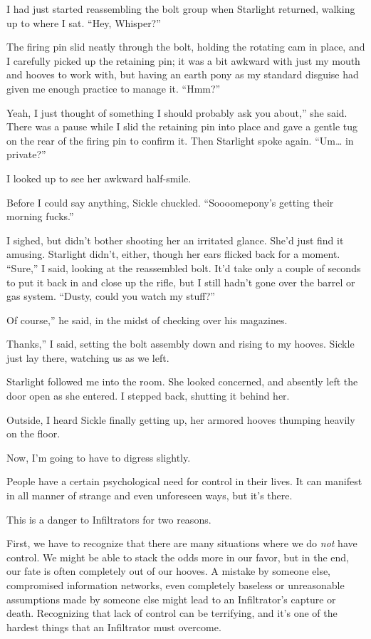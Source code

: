 I had just started reassembling the bolt group when Starlight returned, walking up to where I sat. “Hey, Whisper?”

The firing pin slid neatly through the bolt, holding the rotating cam in place, and I carefully picked up the retaining pin; it was a bit awkward with just my mouth and hooves to work with, but having an earth pony as my standard disguise had given me enough practice to manage it. “Hmm?”

\leavevmode{}Yeah, I just thought of something I should probably ask you about,” she said. There was a pause while I slid the retaining pin into place and gave a gentle tug on the rear of the firing pin to confirm it. Then Starlight spoke again. “Um… in private?”

I looked up to see her awkward half-smile.

Before I could say anything, Sickle chuckled. “Soooomepony’s getting their morning fucks.”

I sighed, but didn’t bother shooting her an irritated glance. She’d just find it amusing. Starlight didn’t, either, though her ears flicked back for a moment. “Sure,” I said, looking at the reassembled bolt. It’d take only a couple of seconds to put it back in and close up the rifle, but I still hadn’t gone over the barrel or gas system. “Dusty, could you watch my stuff?”

\leavevmode{}Of course,” he said, in the midst of checking over his magazines.

\leavevmode{}Thanks,” I said, setting the bolt assembly down and rising to my hooves. Sickle just lay there, watching us as we left.

Starlight followed me into the room. She looked concerned, and absently left the door open as she entered. I stepped back, shutting it behind her.

Outside, I heard Sickle finally getting up, her armored hooves thumping heavily on the floor.

Now, I’m going to have to digress slightly.

People have a certain psychological need for control in their lives. It can manifest in all manner of strange and even unforeseen ways, but it’s there.

This is a danger to Infiltrators for two reasons.

First, we have to recognize that there are many situations where we do \textit{not} have control. We might be able to stack the odds more in our favor, but in the end, our fate is often completely out of our hooves. A mistake by someone else, compromised information networks, even completely baseless or unreasonable assumptions made by someone else might lead to an Infiltrator’s capture or death. Recognizing that lack of control can be terrifying, and it’s one of the hardest things that an Infiltrator must overcome.

